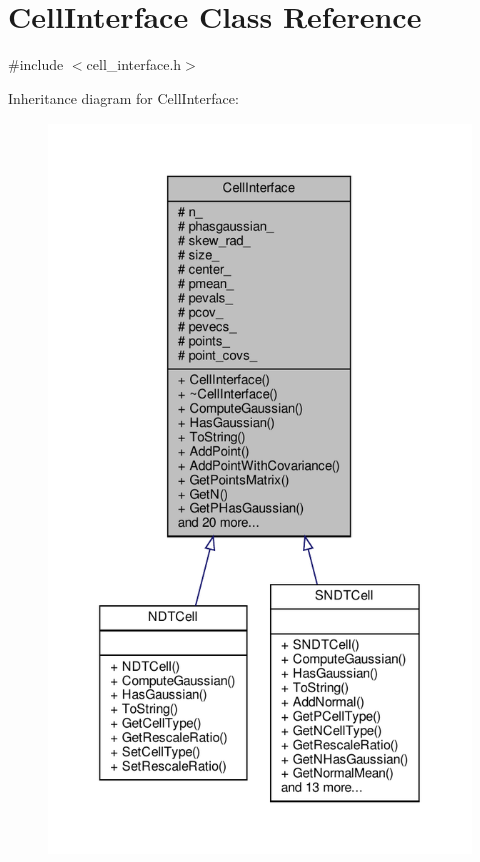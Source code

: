 \hypertarget{classCellInterface}{}\section{Cell\+Interface Class Reference}
\label{classCellInterface}


{\ttfamily \#include $<$cell\+\_\+interface.\+h$>$}



Inheritance diagram for Cell\+Interface\+:\nopagebreak
\begin{figure}[H]
\begin{center}
\leavevmode
\includegraphics[height=550pt]{dd/d7b/classCellInterface__inherit__graph}
\end{center}
\end{figure}


